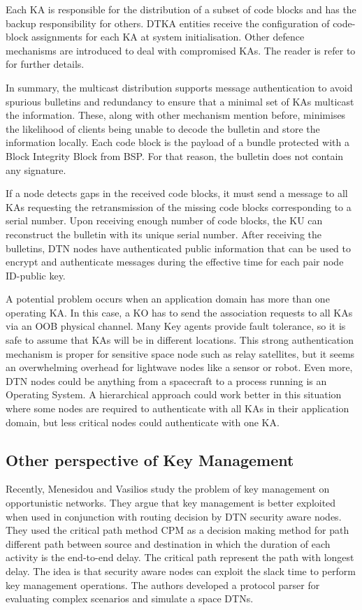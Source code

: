 Each KA is responsible for the distribution of a subset of code blocks and has the backup responsibility for others. DTKA entities receive the configuration of code-block assignments for each KA at system initialisation. Other defence mechanisms are introduced to deal with compromised KAs. The reader is refer to \cite{burleigh-dtnwg-dtka-01} for further details.

In summary, the multicast distribution supports message authentication to avoid spurious bulletins and redundancy to ensure that a minimal set of KAs multicast the information. These, along with other mechanism mention before, minimises the likelihood of clients being unable to decode the bulletin and store the information locally. Each code block is the payload of a bundle protected with a Block Integrity Block from BSP. For that reason, the bulletin does not contain any signature. 

If a node detects gaps in the received code blocks, it must send a message to all KAs requesting the retransmission of the missing code blocks corresponding to a serial number. Upon receiving enough number of code blocks, the KU can reconstruct the bulletin with its unique serial number. After receiving the bulletins, DTN nodes have authenticated public information that can be used to encrypt and authenticate messages during the effective time for each pair node ID-public key. 

A potential problem occurs when an application domain has more than one operating KA. In this case, a KO has to send the association requests to all KAs via an OOB physical channel. Many Key agents provide fault tolerance, so it is safe to assume that KAs will be in different locations. This strong authentication mechanism is proper for sensitive space node such as relay satellites, but it seems an overwhelming overhead for lightwave nodes like a sensor or robot. Even more, DTN nodes could be anything from a spacecraft to a process running is an Operating System. A hierarchical approach could work better in this situation where some nodes are required to authenticate with all KAs in their application domain, but less critical nodes could authenticate with one KA. 

\subsection{Other perspective of Key Management}

Recently, Menesidou and Vasilios \cite{menesidou2016automated} study the problem of key management on opportunistic networks. They argue that key management is better exploited when used in conjunction with routing decision by DTN security aware nodes. They used the critical path method CPM as a decision making method for path different path between source and destination in which the duration of each activity is the end-to-end delay. The critical path represent the path with longest delay. The idea is that security aware nodes can exploit the slack time to perform key management operations. The authors developed a protocol parser for evaluating complex scenarios and simulate a space DTNs.

